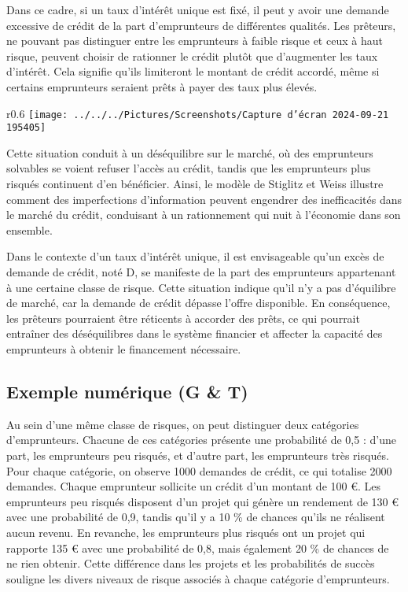 \documentclass[a4paper, 12pt]{report}
\begin{document}
Dans ce cadre, si un taux d'intérêt unique est fixé, il peut y avoir une demande excessive de crédit de la part d'emprunteurs de différentes qualités. Les prêteurs, ne pouvant pas distinguer entre les emprunteurs à faible risque et ceux à haut risque, peuvent choisir de rationner le crédit plutôt que d'augmenter les taux d'intérêt. Cela signifie qu'ils limiteront le montant de crédit accordé, même si certains emprunteurs seraient prêts à payer des taux plus élevés.
\begin{wrapfigure}{r}{0.6\textwidth}
	\centering
	\texttt{[image: ../../../Pictures/Screenshots/Capture d'écran 2024-09-21 195405]}
\end{wrapfigure}
Cette situation conduit à un déséquilibre sur le marché, où des emprunteurs solvables se voient refuser l'accès au crédit, tandis que les emprunteurs plus risqués continuent d'en bénéficier. Ainsi, le modèle de Stiglitz et Weiss illustre comment des imperfections d'information peuvent engendrer des inefficacités dans le marché du crédit, conduisant à un rationnement qui nuit à l'économie dans son ensemble.

Dans le contexte d'un taux d'intérêt unique, il est envisageable qu'un excès de demande de crédit, noté D, se manifeste de la part des emprunteurs appartenant à une certaine classe de risque. Cette situation indique qu'il n'y a pas d'équilibre de marché, car la demande de crédit dépasse l'offre disponible. En conséquence, les prêteurs pourraient être réticents à accorder des prêts, ce qui pourrait entraîner des déséquilibres dans le système financier et affecter la capacité des emprunteurs à obtenir le financement nécessaire.

\subsection{Exemple numérique (G \& T)}

Au sein d'une même classe de risques, on peut distinguer deux catégories d'emprunteurs. Chacune de ces catégories présente une probabilité de 0,5 : d'une part, les emprunteurs peu risqués, et d'autre part, les emprunteurs très risqués. Pour chaque catégorie, on observe 1000 demandes de crédit, ce qui totalise 2000 demandes. Chaque emprunteur sollicite un crédit d'un montant de 100 €. Les emprunteurs peu risqués disposent d'un projet qui génère un rendement de 130 € avec une probabilité de 0,9, tandis qu'il y a 10 \% de chances qu'ils ne réalisent aucun revenu. En revanche, les emprunteurs plus risqués ont un projet qui rapporte 135 € avec une probabilité de 0,8, mais également 20 \% de chances de ne rien obtenir. Cette différence dans les projets et les probabilités de succès souligne les divers niveaux de risque associés à chaque catégorie d'emprunteurs.
\end{document}
